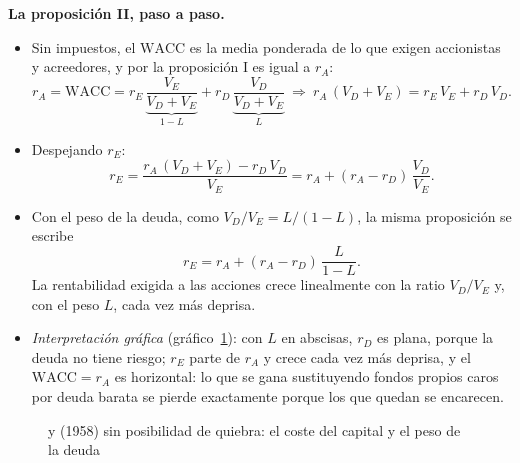 \documentclass[11pt]{article}
\begin{document}
\begin{anotaciones}
\textbf{La proposición II, paso a paso.}
\begin{itemize}
\item Sin impuestos, el $\mathrm{WACC}$ es la media ponderada de lo que exigen accionistas y acreedores, y por la proposición I es igual a $r_A$:
  \[
  r_A=\mathrm{WACC}=r_E\,\underbrace{\frac{V_E}{V_D+V_E}}_{1-L}+r_D\,\underbrace{\frac{V_D}{V_D+V_E}}_{L}\ \Longrightarrow\ r_A\,(V_D+V_E)=r_E\,V_E+r_D\,V_D.
  \]
\item Despejando $r_E$:
  \[
  r_E=\frac{r_A\,(V_D+V_E)-r_D\,V_D}{V_E}=r_A+(r_A-r_D)\,\frac{V_D}{V_E}.
  \]
\item Con el peso de la deuda, como $V_D/V_E=L/(1-L)$, la misma proposición se escribe
  \[
  r_E=r_A+(r_A-r_D)\,\frac{L}{1-L}.
  \]
  La rentabilidad exigida a las acciones crece linealmente con la ratio $V_D/V_E$ y, con el peso $L$, cada vez más deprisa.\findemo
\end{itemize}
\end{anotaciones}

\begin{itemize}
\item \emph{Interpretación gráfica} (gráfico~\ref{fig:coste-mm}): con $L$ en abscisas, $r_D$ es plana, porque la deuda no tiene riesgo; $r_E$ parte de $r_A$ y crece cada vez más deprisa, y el $\mathrm{WACC}=r_A$ es horizontal: lo que se gana sustituyendo fondos propios caros por deuda barata se pierde exactamente porque los que quedan se encarecen.
\end{itemize}

\begin{figure}[H]
\centering
\caption{ y  (1958) sin posibilidad de quiebra: el coste del capital y el peso de la deuda}\label{fig:coste-mm}
\end{figure}
\end{document}
